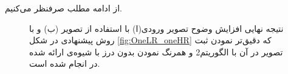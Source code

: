 \documentclass[11pt,a4paper,twocolumn]{article}
\begin{document}
از ادامه مطلب صرفنظر می‌کنیم.
\begin{figure}[tp]
\centering {}%
 \caption{نتیجه نهایی افزایش وضوح تصویر ورودی(ا) با استفاده از تصویر (ب) و با روش پیشنهادی در شکل \ref{fig:OneLR_oneHR} که دقیق‌تر نمودن ثبت تصویر در آن با الگوریتم2 و همرنگ نمودن بدون درز با شیوه‌ی ارائه شده در \cite{Burt83multiresolution} انجام شده است.}
\label{fig:Results}
\end{figure}
\end{document}
